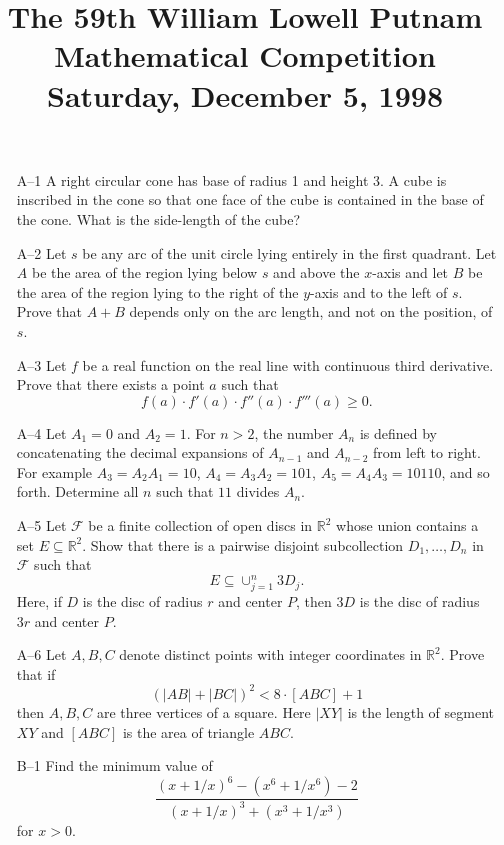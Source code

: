 \documentclass[amssymb,twocolumn,pra,10pt,aps]{revtex4-1}
\begin{document}
\title{The 59th William Lowell Putnam Mathematical Competition \\
    Saturday, December 5, 1998}
\maketitle

\begin{itemize}
\item[A--1]
A right circular cone has base of radius 1 and height 3.  A
cube is inscribed in the cone so that one face of the cube is
contained in the base of the cone.  What is the side-length of
the cube?

\item[A--2]
Let $s$ be any arc of the unit circle lying entirely in the first
quadrant.  Let $A$ be the area of the region lying below $s$ and
above the $x$-axis and let $B$ be the area of the region lying to the
right of the $y$-axis and to the left of $s$.  Prove that $A+B$ depends
only on the arc length, and not on the position, of $s$.

\item[A--3]
Let $f$ be a real function on the real line with continuous third
derivative.  Prove that there exists a point $a$ such that
\[f(a)\cdot f'(a) \cdot f''(a) \cdot f'''(a)\geq 0 .\]

\item[A--4]
Let $A_1=0$ and $A_2=1$.  For $n>2$, the number $A_n$ is defined by
concatenating the decimal expansions of $A_{n-1}$ and $A_{n-2}$ from
left to right.  For example $A_3=A_2 A_1=10$, $A_4=A_3 A_2 = 101$,
$A_5=A_4 A_3 = 10110$, and so forth.  Determine all $n$ such that
$11$ divides $A_n$.

\item[A--5]
Let $\mathcal F$ be a finite collection of open discs in $\mathbb R^2$
whose union contains a set $E\subseteq \mathbb R^2$.  Show that there
is a pairwise disjoint subcollection $D_1,\ldots, D_n$ in $\mathcal F$
such that
\[E\subseteq \cup_{j=1}^n 3D_j.\]
Here, if $D$ is the disc of radius $r$ and center $P$, then $3D$ is the
disc of radius $3r$ and center $P$.

\item[A--6]
Let $A, B, C$ denote distinct points with integer coordinates in $\mathbb
R^2$.  Prove that if
\[(|AB|+|BC|)^2<8\cdot [ABC]+1\]
then $A, B, C$ are three vertices of a square.  Here $|XY|$ is the length
of segment $XY$ and $[ABC]$ is the area of triangle $ABC$.

\item[B--1]
Find the minimum value of
\[\frac{(x+1/x)^6-(x^6+1/x^6)-2}{(x+1/x)^3+(x^3+1/x^3)}\]
for $x>0$.


\end{itemize}
\end{document}
